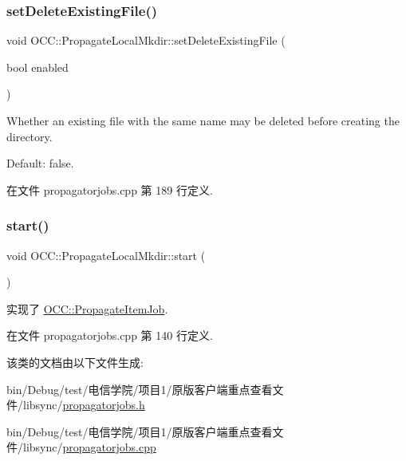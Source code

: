 \subsubsection{\texorpdfstring{set\+Delete\+Existing\+File()}{setDeleteExistingFile()}}
{\footnotesize\ttfamily void O\+C\+C\+::\+Propagate\+Local\+Mkdir\+::set\+Delete\+Existing\+File (\begin{DoxyParamCaption}\item[{bool}]{enabled }\end{DoxyParamCaption})}

Whether an existing file with the same name may be deleted before creating the directory.

Default\+: false. 

在文件 propagatorjobs.\+cpp 第 189 行定义.

\mbox{\label{class_o_c_c_1_1_propagate_local_mkdir_abfc04efdcf2e09708c31531c2527a767}} 
\subsubsection{\texorpdfstring{start()}{start()}}
{\footnotesize\ttfamily void O\+C\+C\+::\+Propagate\+Local\+Mkdir\+::start (\begin{DoxyParamCaption}{ }\end{DoxyParamCaption})\hspace{0.3cm}{\ttfamily [virtual]}}



实现了 \hyperlink{class_o_c_c_1_1_propagate_item_job_a97e7a37e51ad1696f6590dd52080f10a}{O\+C\+C\+::\+Propagate\+Item\+Job}.



在文件 propagatorjobs.\+cpp 第 140 行定义.



该类的文档由以下文件生成\+:\begin{DoxyCompactItemize}
\item 
bin/\+Debug/test/电信学院/项目1/原版客户端重点查看文件/libsync/\hyperlink{propagatorjobs_8h}{propagatorjobs.\+h}\item 
bin/\+Debug/test/电信学院/项目1/原版客户端重点查看文件/libsync/\hyperlink{propagatorjobs_8cpp}{propagatorjobs.\+cpp}\end{DoxyCompactItemize}
